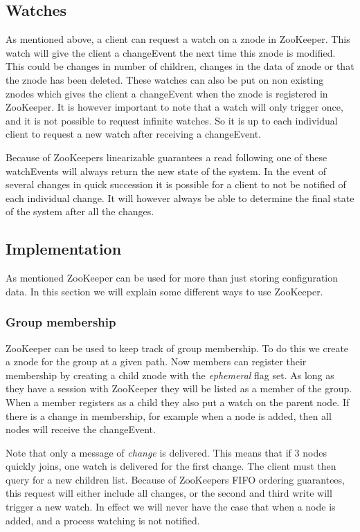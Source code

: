 \subsection{Watches}
As mentioned above, a client can request a watch on a znode in ZooKeeper. This watch will give the client a changeEvent the next time this znode is modified. This could be changes in number of children, changes in the data of znode or that the znode has been deleted. These watches can also be put on non existing znodes which gives the client a changeEvent when the znode is registered in ZooKeeper. It is however important to note that a watch will only trigger once, and it is not possible to request infinite watches. So it is up to each individual client to request a new watch after receiving a changeEvent.

Because of ZooKeepers linearizable guarantees a read following one of these watchEvents will always return the new state of the system. In the event of several changes in quick succession it is possible for a client to not be notified of each individual change. It will however always be able to determine the final state of the system after all the changes.

\subsection{Implementation}

As mentioned ZooKeeper can be used for more than just storing configuration data. In this section we will explain some different ways to use ZooKeeper. 

\subsubsection{Group membership}
ZooKeeper can be used to keep track of group membership. To do this we create a znode for the group at a given path. Now members can register their membership by creating a child znode with the \emph{ephemeral} flag set. As long as they have a session with ZooKeeper they will be listed as a member of the group. When a member registers as a child they also put a watch on the parent node. If there is a change in membership, for example when a node is added, then all nodes will receive the changeEvent.

Note that only a message of \emph{change} is delivered. This means that if 3 nodes quickly joins, one watch is delivered for the first change. The client must then query for a new children list. Because of ZooKeepers FIFO ordering guarantees, this request will either include all changes, or the second and third write will trigger a new watch. In effect we will never have the case that when a node is added, and a process watching is not notified. 

